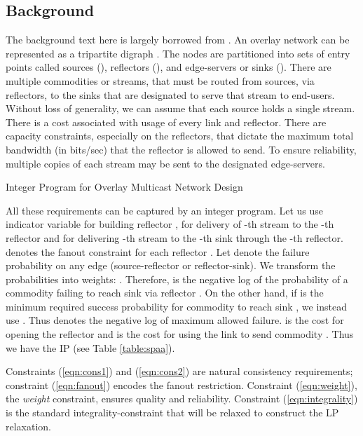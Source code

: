 \subsection{Background} The background text here is largely borrowed from \cite{DBLP:conf/spaa/AndreevMMS03}. An overlay network can be represented as a tripartite digraph . The nodes  are partitioned into sets of entry points called sources (), reflectors (), and edge-servers or sinks (). There are multiple commodities or streams, that must be routed from sources, via reflectors, to the sinks that are designated to serve that stream to end-users. Without loss of generality, we can assume that each source holds a single stream. 
There is a cost associated with usage of every link and reflector. 
 There are capacity constraints, especially on the reflectors,
that dictate the maximum total bandwidth (in bits/sec) that the reflector is allowed to send. 
To ensure reliability, multiple copies of each stream may be sent to the designated edge-servers.
\begin{table*}

\caption{Integer Program for Overlay Multicast Network Design}
\label{table:spaa}
\end{table*}

All these requirements can be captured by an integer program. Let us use indicator variable  for building reflector ,  for delivery of -th stream to the -th reflector and   for delivering -th stream to the -th sink through the -th reflector.  denotes the fanout constraint for each reflector . Let  denote the failure probability on any edge (source-reflector or reflector-sink). We transform the probabilities into weights: . Therefore,  is the negative log of the probability of a commodity   failing to reach sink  via reflector . On the other hand, if  is the minimum required success probability for commodity  to reach sink , we instead use . Thus  denotes the negative log of maximum allowed failure.  is the cost for opening the reflector  and  is the cost for using the link  to send commodity . Thus we have the IP (see Table \ref{table:spaa}).

Constraints (\ref{eqn:cons1}) and (\ref{eqn:cons2}) are natural consistency
requirements; constraint (\ref{eqn:fanout}) encodes the fanout restriction.
Constraint (\ref{eqn:weight}), the \emph{weight} constraint, ensures
quality and reliability. Constraint (\ref{eqn:integrality}) is the standard
integrality-constraint that will be relaxed to construct the LP relaxation.

